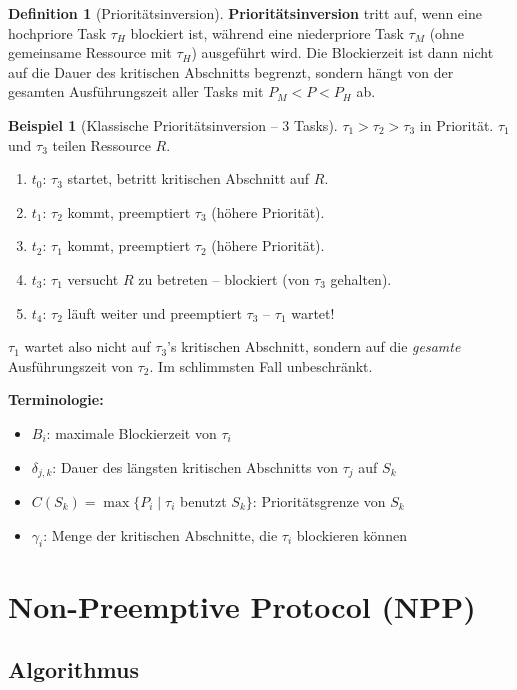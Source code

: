 ﻿\documentclass[a4paper,12pt]{report}
\theoremstyle{definition}
\newtheorem{definition}{Definition}[chapter]
\newtheorem{beispiel}{Beispiel}[chapter]
\begin{document}
\begin{definition}[Prioritätsinversion]
	\textbf{Prioritätsinversion} tritt auf, wenn eine hochpriore Task $\tau_H$
	blockiert ist, während eine niederpriore Task $\tau_M$ (ohne gemeinsame
	Ressource mit $\tau_H$) ausgeführt wird. Die Blockierzeit ist dann nicht
	auf die Dauer des kritischen Abschnitts begrenzt, sondern hängt von der
	gesamten Ausführungszeit aller Tasks mit $P_M < P < P_H$ ab.
\end{definition}

\begin{beispiel}[Klassische Prioritätsinversion -- 3 Tasks]
	$\tau_1 > \tau_2 > \tau_3$ in Priorität. $\tau_1$ und $\tau_3$ teilen Ressource $R$.
	\begin{enumerate}
		\item $t_0$: $\tau_3$ startet, betritt kritischen Abschnitt auf $R$.
		\item $t_1$: $\tau_2$ kommt, preemptiert $\tau_3$ (höhere Priorität).
		\item $t_2$: $\tau_1$ kommt, preemptiert $\tau_2$ (höhere Priorität).
		\item $t_3$: $\tau_1$ versucht $R$ zu betreten -- blockiert (von $\tau_3$ gehalten).
		\item $t_4$: $\tau_2$ läuft weiter und preemptiert $\tau_3$ -- $\tau_1$ wartet!
	\end{enumerate}
	$\tau_1$ wartet also nicht auf $\tau_3$'s kritischen Abschnitt, sondern auf die
	\emph{gesamte} Ausführungszeit von $\tau_2$. Im schlimmsten Fall unbeschränkt.
\end{beispiel}

\textbf{Terminologie:}
\begin{itemize}
	\item $B_i$: maximale Blockierzeit von $\tau_i$
	\item $\delta_{j,k}$: Dauer des längsten kritischen Abschnitts von $\tau_j$ auf $S_k$
	\item $C(S_k) = \max\{P_i \mid \tau_i$ benutzt $S_k\}$: Prioritätsgrenze von $S_k$
	\item $\gamma_i$: Menge der kritischen Abschnitte, die $\tau_i$ blockieren können
\end{itemize}

\section{Non-Preemptive Protocol (NPP)}

\subsection{Algorithmus}
\end{document}
